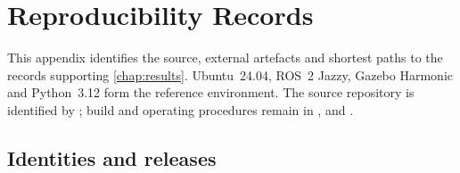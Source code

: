 \chapter{Reproducibility Records}
\label{app:reproducibility}

This appendix identifies the source, external artefacts and shortest paths to
the records supporting \cref{chap:results}. Ubuntu~24.04, ROS~2 Jazzy, Gazebo
Harmonic and Python~3.12 form the reference environment. The source repository
is identified by \citep{mfjarepository}; build and operating procedures remain
in , \mbox{} and
\mbox{}\allowbreak
\mbox{}\allowbreak
\mbox{}.

\section{Identities and releases}

